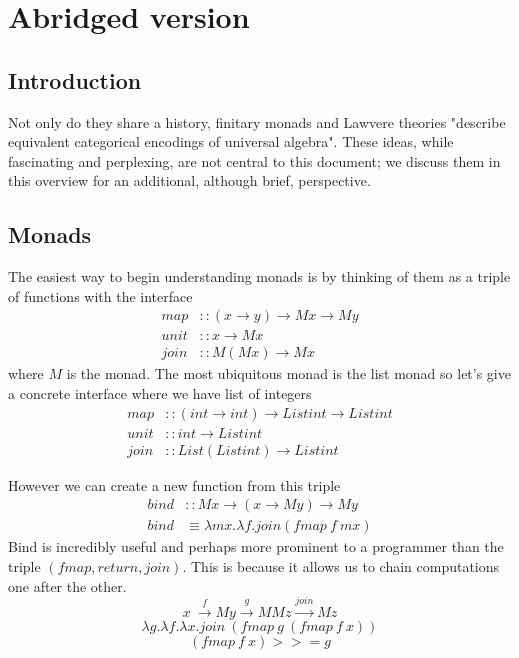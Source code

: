 \section{Abridged version}

\subsection{Introduction}
Not only do they share a history, finitary monads and Lawvere theories
"describe equivalent categorical encodings of universal algebra"\cite{riehl}.
These ideas, while fascinating and perplexing,
are not central to this document;
we discuss them in this overview for an additional,
although brief, perspective.

\subsection{Monads}
The easiest way to begin understanding monads is by thinking of them
as a triple of functions with the interface
\begin{equation}
  \begin{split}
    map  &:: (x \rightarrow y) \rightarrow M x \rightarrow M y \\
    unit &:: x \rightarrow M x                                 \\
    join &:: M (M x) \rightarrow M x
  \end{split}
\end{equation}
where $M$ is the monad. The most ubiquitous monad is the list monad
so let's give a concrete interface where we have list of integers
\begin{equation}
  \begin{split}
    map  &:: (int \rightarrow int) \rightarrow List int \rightarrow List int \\
    unit &:: int \rightarrow List int                                        \\
    join &:: List (List int) \rightarrow List int
  \end{split}
\end{equation}

However we can create a new function from this triple
\begin{align}
    bind &:: M x \rightarrow (x \rightarrow M y) \rightarrow M y \\
    bind &\equiv \lambda mx. \lambda f. join(fmap\ f\ mx)
\end{align}
Bind is incredibly useful and perhaps more prominent to a programmer than the triple $(fmap,return,join)$.
This is because it allows us to chain computations
one after the other.
\begin{equation}
    x\
    \stackrel{f}{\rightarrow} My
    \stackrel{g}{\rightarrow} MMz
    \stackrel{join}{\rightarrow} Mz
\end{equation}
\begin{equation}
    \lambda g.
    \lambda f.
    \lambda x.
    join\ (fmap\ g\ (fmap\ f\ x))
\end{equation}
\begin{equation}
    (fmap\ f\ x) >>= g
\end{equation}

